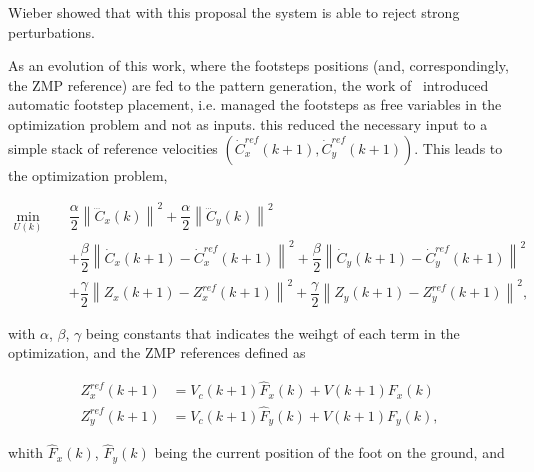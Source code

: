 Wieber showed that with this proposal the system is able to reject strong perturbations.

As an evolution of this work, where the footsteps positions (and, correspondingly, the ZMP reference) are fed to the pattern generation, the work of~\citep{HerdtAR2010} introduced automatic footstep placement, i.e. managed the footsteps as free variables in the optimization problem and not as inputs. this reduced the necessary input to a simple stack of reference velocities $(\dot{C}_{x}^{ref}(k+1),\dot{C}_{y}^{ref}(k+1))$. This leads to the optimization problem,

\begin{eqnarray}
\nonumber
 \underset{U(k)}{\min} \; && \dfrac{\alpha}{2} \left\| \dddot{C}_x(k) \right\|^2 + \dfrac{\alpha}{2} \left\| \dddot{C}_y(k) \right\|^2 \\
&& + \dfrac{\beta}{2} \left\| \dot{C}_{x}(k+1) - \dot{C}_{x}^{ref}(k+1) \right\|^2 + \dfrac{\beta}{2} \left\| \dot{C}_{y}(k+1) - \dot{C}_{y}^{ref}(k+1) \right\|^2  \nonumber \\
&& + \dfrac{\gamma}{2} \left\| Z_x(k+1) - Z_x^{ref}(k+1) \right\|^2 + \dfrac{\gamma}{2} \left\| Z_y(k+1) - Z_y^{ref}(k+1) \right\|^2,
\label{Eq:MinJerk}
\end{eqnarray}

with $\alpha$, $\beta$, $\gamma$ being constants that indicates the weihgt of each term in the optimization, and the ZMP references defined as

\begin{eqnarray}
\label{Eq:ZMPReference}
  Z_x^{ref}(k+1) & = V_c(k+1) \hat{F}_x(k) + V(k+1) F_x(k) \nonumber \\
  Z_y^{ref}(k+1) & = V_c(k+1) \hat{F}_y(k) + V(k+1) F_y(k),
\end{eqnarray}

whith $\hat{F}_x(k)$, $\hat{F}_y(k)$ being the current position of the foot on
the ground, and

